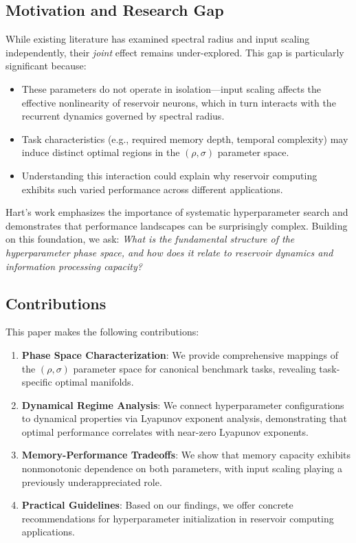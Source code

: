 \documentclass[11pt]{article}
\begin{document}
\subsection{Motivation and Research Gap}

While existing literature has examined spectral radius and input scaling independently, their \emph{joint} effect remains under-explored. This gap is particularly significant because:

\begin{itemize}
    \item These parameters do not operate in isolation—input scaling affects the effective nonlinearity of reservoir neurons, which in turn interacts with the recurrent dynamics governed by spectral radius.
    \item Task characteristics (e.g., required memory depth, temporal complexity) may induce distinct optimal regions in the $(\rho, \sigma)$ parameter space.
    \item Understanding this interaction could explain why reservoir computing exhibits such varied performance across different applications.
\end{itemize}

Hart's work \cite{hart2022exploring, hart2024thesis} emphasizes the importance of systematic hyperparameter search and demonstrates that performance landscapes can be surprisingly complex. Building on this foundation, we ask: \emph{What is the fundamental structure of the hyperparameter phase space, and how does it relate to reservoir dynamics and information processing capacity?}

\subsection{Contributions}

This paper makes the following contributions:

\begin{enumerate}
    \item \textbf{Phase Space Characterization}: We provide comprehensive mappings of the $(\rho, \sigma)$ parameter space for canonical benchmark tasks, revealing task-specific optimal manifolds.
    
    \item \textbf{Dynamical Regime Analysis}: We connect hyperparameter configurations to dynamical properties via Lyapunov exponent analysis, demonstrating that optimal performance correlates with near-zero Lyapunov exponents.
    
    \item \textbf{Memory-Performance Tradeoffs}: We show that memory capacity exhibits nonmonotonic dependence on both parameters, with input scaling playing a previously underappreciated role.
    
    \item \textbf{Practical Guidelines}: Based on our findings, we offer concrete recommendations for hyperparameter initialization in reservoir computing applications.
\end{enumerate}
\end{document}
